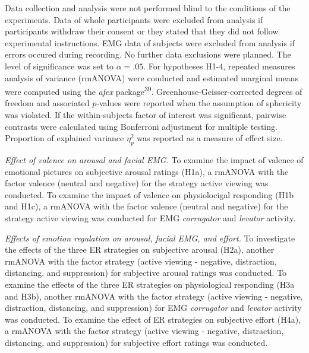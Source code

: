 \documentclass[
  man,floatsintext]{apa6}
\begin{document}
Data collection and analysis were not performed blind to the conditions of the experiments.
Data of whole participants were excluded from analysis if participants withdraw their consent or they stated that they did not follow experimental instructions.
EMG data of subjects were excluded from analysis if errors occured during recording.
No further data exclusions were planned.
The level of significance was set to \(\alpha=.05\).
For hypotheses H1-4, repeated measures analysis of variance (rmANOVA) were conducted and estimated marginal means were computed using the \emph{afex} package\textsuperscript{39}.
Greenhouse-Geisser-corrected degrees of freedom and associated \(p\)-values were reported when the assumption of sphericity was violated.
If the within-subjects factor of interest was significant, pairwise contrasts were calculated using Bonferroni adjustment for multiple testing.
Proportion of explained variance \(\eta_{p}^{2}\) was reported as a measure of effect size.

\emph{Effect of valence on arousal and facial EMG.}
To examine the impact of valence of emotional pictures on subjective arousal ratings (H1a), a rmANOVA with the factor valence (neutral and negative) for the strategy active viewing was conducted.
To examine the impact of valence on physiolocigal responding (H1b and H1c), a rmANOVA with the factor valence (neutral and negative) for the strategy active viewing was conducted for EMG \emph{corrugator} and \emph{levator} activity.

\emph{Effects of emotion regulation on arousal, facial EMG, and effort.}
To investigate the effects of the three ER strategies on subjective arousal (H2a), another rmANOVA with the factor strategy (active viewing - negative, distraction, distancing, and suppression) for subjective arousal ratings was conducted.
To examine the effects of the three ER strategies on physiological responding (H3a and H3b), another rmANOVA with the factor strategy (active viewing - negative, distraction, distancing, and suppression) for EMG \emph{corrugator} and \emph{levator} activity was conducted.
To examine the effect of ER strategies on subjective effort (H4a), a rmANOVA with the factor strategy (active viewing - negative, distraction, distancing, and suppression) for subjective effort ratings was conducted.
\end{document}
